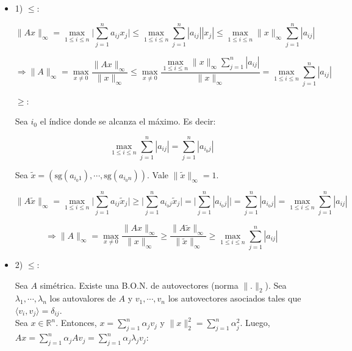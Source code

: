 \begin{itemize}
	\item 1)
	$\leq$:

	$$\|Ax\|_{\infty} = \max \limits_{1 \leq i \leq n} \bigg|\sum \limits_{j = 1}^{n} a_{ij}x_{j}\bigg|  \leq \max \limits_{1 \leq i \leq n} \sum \limits_{j = 1}^{n} |a_{ij}||x_{j}| \leq \max \limits_{1 \leq i \leq n} \|x\|_{\infty} \sum \limits_{j = 1}^{n} |a_{ij}|$$

	$$\Rightarrow \|A\|_{\infty} = \max \limits_{x \neq 0} \frac{\|Ax\|_{\infty}}{\|x\|_{\infty}} \leq \max \limits_{x \neq 0} \frac{\max \limits_{1 \leq i \leq n} \|x\|_{\infty} \sum \limits_{j = 1}^{n} |a_{ij}|}{\|x\|_{\infty}} = \max \limits_{1 \leq i \leq n} \sum \limits_{j = 1}^{n} |a_{ij}|$$
	
	$\geq$:
	
	Sea $i_{0}$ el \'indice donde se alcanza el m\'aximo. Es decir:
	
	$$\max \limits_{1 \leq i \leq n} \sum \limits_{j = 1}^{n} |a_{ij}| = \sum \limits_{j = 1}^{n} |a_{i_{0}j}|$$
	
	Sea $\tilde{x} = (\text{sg}(a_{i_{0}1}), \cdots, \text{sg}(a_{i_{0}n}))$. Vale $\|\tilde{x}\|_{\infty} = 1$.
	
	$$\|A\tilde{x}\|_{\infty} = \max \limits_{1 \leq i \leq n} \bigg|\sum \limits_{j = 1}^{n} a_{ij}\tilde{x}_{j}\bigg|  \geq \bigg|\sum \limits_{j = 1}^{n} a_{i_{0}j}\tilde{x}_{j}\bigg| = \bigg|\sum \limits_{j = 1}^{n} |a_{i_{0}j}|\bigg| = \sum \limits_{j = 1}^{n} |a_{i_{0}j}| = \max \limits_{1 \leq i \leq n} \sum \limits_{j = 1}^{n} |a_{ij}|$$
	
	$$\Rightarrow \|A\|_{\infty} = \max \limits_{x \neq 0} \frac{\|Ax\|_{\infty}}{\|x\|_{\infty}} \geq \frac{\|A\tilde{x}\|_{\infty}}{\|\tilde{x}\|_{\infty}} \geq \max \limits_{1 \leq i \leq n} \sum \limits_{j = 1}^{n} |a_{ij}|$$
	
	\item 2)
	$\leq$:
	
	Sea $A$ sim\'etrica. Existe una B.O.N. de autovectores (norma $\|.\|_{2}$). Sea $\lambda_{1}, \cdots, \lambda_{n}$ los autovalores de $A$ y $v_{1}, \cdots, v_{n}$ los autovectores asociados tales que $\langle v_{i}, v_{j} \rangle = \delta_{ij}$.\\
	
	Sea $x \in \mathbb{R}^{n}$. Entonces, $x = \sum \limits_{j = 1}^{n} \alpha_{j}v_{j}$ y $\|x\|_{2}^{2} = \sum \limits_{j = 1}^{n} \alpha_{j}^{2}$. Luego, $Ax = \sum \limits_{j = 1}^{n} \alpha_{j}Av_{j} = \sum \limits_{j = 1}^{n} \alpha_{j}\lambda_{j}v_{j}$:
	

\end{itemize}
